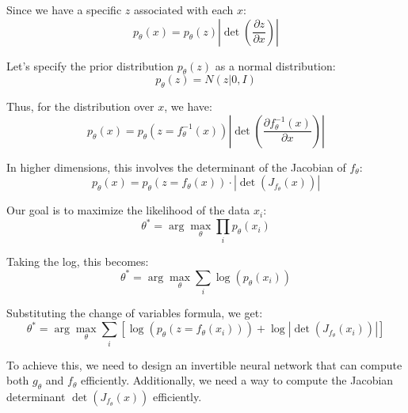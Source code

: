 \documentclass[a4paper]{article}
\begin{document}
Since we have a specific \( z \) associated with each \( x \):
\[
p_{\theta}(x) = p_{\theta}(z) \left| \det \left( \frac{\partial z}{\partial x} \right) \right|
\]

Let's specify the prior distribution \( p_{\theta}(z) \) as a normal distribution:
\[ 
p_{\theta}(z) = N(z | 0, I) 
\]

Thus, for the distribution over \( x \), we have:
\[
p_{\theta}(x) = p_{\theta}(z = f_{\theta}^{-1}(x)) \left| \det \left( \frac{\partial f_{\theta}^{-1}(x)}{\partial x} \right) \right|
\]

In higher dimensions, this involves the determinant of the Jacobian of \( f_{\theta} \):
\[
p_{\theta}(x) = p_{\theta}(z = f_{\theta}(x)) \cdot \left| \det(J_{f_{\theta}}(x)) \right|
\]

Our goal is to maximize the likelihood of the data \( x_i \):
\[
\theta^* = \arg \max_\theta \prod_i p_\theta(x_i)
\]

Taking the log, this becomes:
\[
\theta^* = \arg \max_\theta \sum_i \log(p_\theta(x_i))
\]

Substituting the change of variables formula, we get:
\[
\theta^* = \arg \max_\theta \sum_i \left[ \log(p_\theta(z = f_\theta(x_i))) + \log \left| \det(J_{f_\theta}(x_i)) \right| \right]
\]

To achieve this, we need to design an invertible neural network that can compute both \( g_\theta \) and \( f_\theta \) efficiently. Additionally, we need a way to compute the Jacobian determinant \( \det(J_{f_\theta}(x)) \) efficiently.
\end{document}
